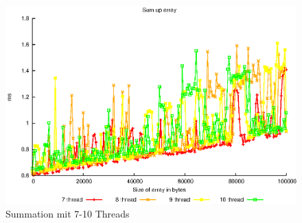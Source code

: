 \documentclass[a4paper,
12pt,
BCOR12mm,
]{scrartcl}
\begin{document}
\begin{figure}[!h]
	\begin{center}
		\includegraphics[width=\textwidth]{../a_4_1/graphs/summation_3rd}
	\end{center}
	\caption{Summation mit 7-10 Threads}
	\label{fig:summation_7_10}
\end{figure}
\end{document}
